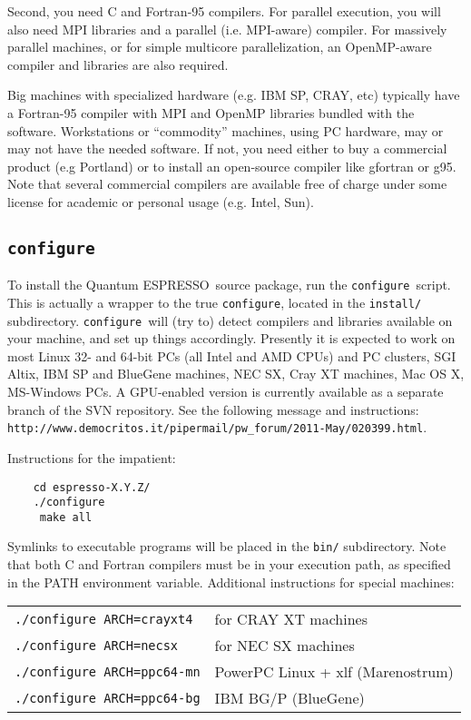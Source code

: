 \documentclass[12pt,a4paper]{article}
\def\qe{{\sc Quantum ESPRESSO}}
\def\configure{\texttt{configure}}
\begin{document}
Second, you need C and Fortran-95 compilers. For parallel 
execution, you will also need MPI libraries and a parallel
(i.e. MPI-aware) compiler. For massively parallel machines, or 
for simple multicore parallelization, an OpenMP-aware compiler
and libraries are also required.

Big machines with
specialized hardware (e.g. IBM SP, CRAY, etc) typically have a
Fortran-95 compiler with MPI and OpenMP libraries bundled with 
the software. Workstations or ``commodity'' machines, using PC 
hardware, may or may not have the needed software. If not, you need 
either to buy a commercial product (e.g Portland) or to install
an open-source compiler like gfortran or g95. 
Note that several commercial compilers are available free of charge
under some license for academic or personal usage (e.g. Intel, Sun). 

\subsection{\configure}

To install the \qe\ source package, run the \configure{}ript. This is actually a wrapper to the true \configure,
located in the \texttt{install/} subdirectory. \configure\
will (try to) detect compilers and libraries available on
your machine, and set up things accordingly. Presently it is expected
to work on most Linux 32- and 64-bit PCs (all Intel and AMD CPUs) and 
PC clusters, SGI Altix, IBM SP and BlueGene machines, NEC SX, Cray XT
machines, Mac OS X, MS-Windows PCs. A GPU-enabled version is currently
available as a separate branch of the SVN repository. See the following 
message and instructions:\\
\texttt{http://www.democritos.it/pipermail/pw\_forum/2011-May/020399.html}.

Instructions for the impatient:
\begin{verbatim}
    cd espresso-X.Y.Z/
    ./configure
     make all
\end{verbatim}
Symlinks to executable programs will be placed in the
\texttt{bin/}
subdirectory. Note that both C and Fortran compilers must be in your execution
path, as specified in the PATH environment variable.
Additional instructions for special machines:

\begin{tabular}{ll}
    \texttt{./configure ARCH=crayxt4}& for CRAY XT machines \\
    \texttt{./configure ARCH=necsx}   & for NEC SX machines \\
    \texttt{./configure ARCH=ppc64-mn}& PowerPC Linux + xlf (Marenostrum) \\
    \texttt{./configure ARCH=ppc64-bg}& IBM BG/P (BlueGene)
\end{tabular}
\end{document}
